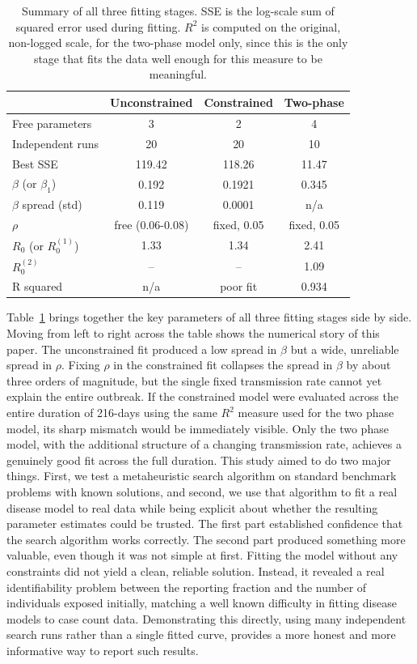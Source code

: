 \documentclass[journal]{IEEEtran}
\begin{document}
\begin{table}[H]
\centering
\caption{Summary of all three fitting stages. SSE is the log-scale sum of squared error used during fitting. $R^2$ is computed on the original, non-logged scale, for the two-phase model only, since this is the only stage that fits the data well enough for this measure to be meaningful.}
\label{tab:summary}
\small
\begin{tabular}{lccc}
\toprule
& Unconstrained & Constrained & Two-phase \\
\midrule
Free parameters & 3 & 2 & 4 \\
Independent runs & 20 & 20 & 10 \\
Best SSE & 119.42 & 118.26 & 11.47 \\
$\beta$ (or $\beta_1$) & 0.192 & 0.1921 & 0.345 \\
$\beta$ spread (std) & 0.119 & 0.0001 & n/a \\
$\rho$ & free (0.06-0.08) & fixed, 0.05 & fixed, 0.05 \\
$R_0$ (or $R_0^{(1)}$) & 1.33 & 1.34 & 2.41 \\
$R_0^{(2)}$ & -- & -- & 1.09 \\
R squared & n/a & poor fit & 0.934 \\
\bottomrule
\end{tabular}
\end{table}

Table~\ref{tab:summary} brings together the key parameters of all three fitting stages side by side. Moving from left to right across the table shows the numerical story of this paper. The unconstrained fit produced a low spread in $\beta$ but a wide, unreliable spread in $\rho$. Fixing $\rho$ in the constrained fit collapses the spread in $\beta$ by about three orders of magnitude, but the single fixed transmission rate cannot yet explain the entire outbreak. If the constrained model were evaluated across the entire duration of 216-days using the same $R^2$ measure used for the two phase model, its sharp mismatch would be immediately visible. Only the two phase model, with the additional structure of a changing transmission rate, achieves a genuinely good fit across the full duration. This study aimed to do two major things. First, we test a metaheuristic search algorithm on standard benchmark problems with known solutions, and second, we use that algorithm to fit a real disease model to real data while being explicit about whether the resulting parameter estimates could be trusted. The first part established confidence that the search algorithm works correctly. The second part produced something more valuable, even though it was not simple at first. Fitting the model without any constraints did not yield a clean, reliable solution. Instead, it revealed a real identifiability problem between the reporting fraction and the number of individuals exposed initially, matching a well known difficulty in fitting disease models to case count data. Demonstrating this directly, using many independent search runs rather than a single fitted curve, provides a more honest and more informative way to report such results.
\end{document}
